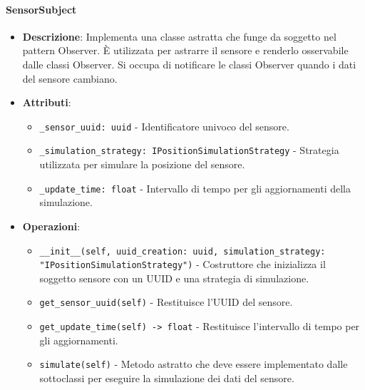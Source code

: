 \documentclass[10pt]{article}
\begin{document}
    \paragraph{SensorSubject}
    \begin{itemize} 
    \item \textbf{Descrizione}: Implementa una classe astratta che funge da soggetto nel pattern Observer. È utilizzata per astrarre il sensore e renderlo osservabile dalle classi Observer. Si occupa di notificare le classi Observer quando i dati del sensore cambiano.
    \item \textbf{Attributi}:
    \begin{itemize}
        \item \texttt{\_sensor\_uuid: uuid} - Identificatore univoco del sensore.
        \item \texttt{\_simulation\_strategy: IPositionSimulationStrategy} - Strategia utilizzata per simulare la posizione del sensore.
        \item \texttt{\_update\_time: float} - Intervallo di tempo per gli aggiornamenti della simulazione.
    \end{itemize}
    
    \item \textbf{Operazioni}:
    \begin{itemize}
        \item \texttt{\_\_init\_\_(self, uuid\_creation: uuid, simulation\_strategy: "IPositionSimulationStrategy")} - Costruttore che inizializza il soggetto sensore con un UUID e una strategia di simulazione.
        
        \item \texttt{get\_sensor\_uuid(self)} - Restituisce l'UUID del sensore.
        
        \item \texttt{get\_update\_time(self) -> float} - Restituisce l'intervallo di tempo per gli aggiornamenti.
        
        \item \texttt{simulate(self)} - Metodo astratto che deve essere implementato dalle sottoclassi per eseguire la simulazione dei dati del sensore.
    \end{itemize}
    \end{itemize}
\end{document}
